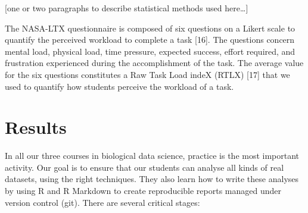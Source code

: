 \documentclass{aims}
\theoremstyle{definition}
\begin{document}
{[}one or two paragraphs to describe statistical methods used
here\ldots{]}

The NASA-LTX questionnaire is composed of six questions on a Likert
scale to quantify the perceived workload to complete a task {[}16{]}.
The questions concern mental load, physical load, time pressure,
expected success, effort required, and frustration experienced during
the accomplishment of the task. The average value for the six questions
constitutes a Raw Task Load indeX (RTLX) {[}17{]} that we used to
quantify how students perceive the workload of a task.

\hypertarget{results}{%
\section{Results}\label{results}}

In all our three courses in biological data science, practice is the
most important activity. Our goal is to ensure that our students can
analyse all kinds of real datasets, using the right techniques. They
also learn how to write these analyses by using R and R Markdown to
create reproducible reports managed under version control (git). There
are several critical stages:
\end{document}
